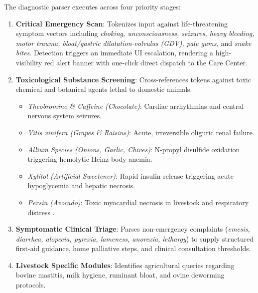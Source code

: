 \documentclass[conference]{IEEEtran}
\begin{document}
The diagnostic parser executes across four priority stages:
\begin{enumerate}
    \item \textbf{Critical Emergency Scan}: Tokenizes input against life-threatening symptom vectors including \textit{choking, unconsciousness, seizures, heavy bleeding, motor trauma, bloat/gastric dilatation-volvulus (GDV), pale gums,} and \textit{snake bites}. Detection triggers an immediate UI escalation, rendering a high-visibility red alert banner with one-click direct dispatch to the Care Center.
    \item \textbf{Toxicological Substance Screening}: Cross-references tokens against toxic chemical and botanical agents lethal to domestic animals:
    \begin{itemize}
        \item \textit{Theobromine \& Caffeine (Chocolate)}: Cardiac arrhythmias and central nervous system seizures.
        \item \textit{Vitis vinifera (Grapes \& Raisins)}: Acute, irreversible oliguric renal failure.
        \item \textit{Allium Species (Onions, Garlic, Chives)}: N-propyl disulfide oxidation triggering hemolytic Heinz-body anemia.
        \item \textit{Xylitol (Artificial Sweetener)}: Rapid insulin release triggering acute hypoglycemia and hepatic necrosis.
        \item \textit{Persin (Avocado)}: Toxic myocardial necrosis in livestock and respiratory distress \cite{cortinovis2013}.
    \end{itemize}
    \item \textbf{Symptomatic Clinical Triage}: Parses non-emergency complaints (\textit{emesis, diarrhea, alopecia, pyrexia, lameness, anorexia, lethargy}) to supply structured first-aid guidance, home palliative steps, and clinical consultation thresholds.
    \item \textbf{Livestock Specific Modules}: Identifies agricultural queries regarding bovine mastitis, milk hygiene, ruminant bloat, and ovine deworming protocols.
\end{enumerate}
\end{document}
